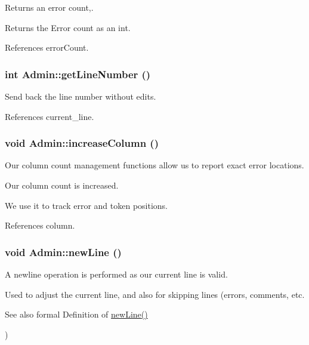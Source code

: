 Returns an error count,. 

Returns the Error count as an int.

References errorCount.

\hypertarget{classAdmin_a1a33282a2d64fa3dd9b3e8ac1a4799e3}{
\subsubsection[{getLineNumber}]{\setlength{\rightskip}{0pt plus 5cm}int Admin::getLineNumber ()}}
\label{classAdmin_a1a33282a2d64fa3dd9b3e8ac1a4799e3}


Send back the line number without edits. 



References current\_\-line.

\hypertarget{classAdmin_a89653dd68c51b51d9003a2518a56175f}{
\subsubsection[{increaseColumn}]{\setlength{\rightskip}{0pt plus 5cm}void Admin::increaseColumn ()}}
\label{classAdmin_a89653dd68c51b51d9003a2518a56175f}


Our column count management functions allow us to report exact error locations. 

Our column count is increased.

We use it to track error and token positions. 

References column.

\hypertarget{classAdmin_ae121a9ce2a34ac4075d074c2d1f306c5}{
\subsubsection[{newLine}]{\setlength{\rightskip}{0pt plus 5cm}void Admin::newLine ()}}
\label{classAdmin_ae121a9ce2a34ac4075d074c2d1f306c5}


A newline operation is performed as our current line is valid. 

Used to adjust the current line, and also for skipping lines (errors, comments, etc.

\begin{DoxySeeAlso}{See also}
formal Definition of \hyperlink{classAdmin_ae121a9ce2a34ac4075d074c2d1f306c5}{newLine()}
\end{DoxySeeAlso}
) 


